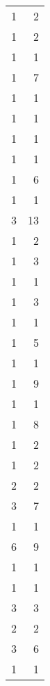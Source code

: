 \begin{tabular}{rr}
                  1 &             2 \\
                  1 &             2 \\
                  1 &             1 \\
                  1 &             7 \\
                  1 &             1 \\
                  1 &             1 \\
                  1 &             1 \\
                  1 &             1 \\
                  1 &             6 \\
                  1 &             1 \\
                  3 &            13 \\
                  1 &             2 \\
                  1 &             3 \\
                  1 &             1 \\
                  1 &             3 \\
                  1 &             1 \\
                  1 &             5 \\
                  1 &             1 \\
                  1 &             9 \\
                  1 &             1 \\
                  1 &             8 \\
                  1 &             2 \\
                  1 &             2 \\
                  2 &             2 \\
                  3 &             7 \\
                  1 &             1 \\
                  6 &             9 \\
                  1 &             1 \\
                  1 &             1 \\
                  3 &             3 \\
                  2 &             2 \\
                  3 &             6 \\
                  1 &             1 \\

\end{tabular}
